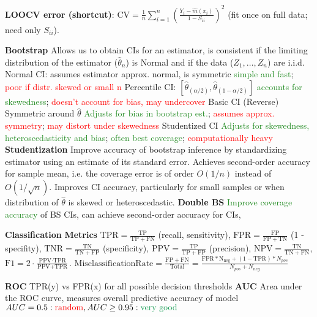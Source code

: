 \documentclass[9pt]{article}
\renewcommand\small{\footnotesize}
\newcommand{\toptopic}[1]{\textbf{{#1}}}
\newcommand{\highlight}[1]{\small{\textcolor{Sepia}{#1}}}
\newcommand{\topic}[1]{\small{\textbf{\textcolor{Sepia}{#1}}}}
\begin{document}
\begin{multicols*}{3}
\topic{LOOCV error (shortcut)}:
$\displaystyle \text{CV} = \frac{1}{n}\sum_{i=1}^n \left(\frac{Y_i - \hat m(x_i)}{1 - S_{ii}}\right)^2$
\quad (fit once on full data; need only $S_{ii}$).


\toptopic{Bootstrap}
Allows us to obtain CIs for an estimator, is consistent if the limiting distribution of the estimator ($\hat{\theta}_n$) is Normal and if the data ($Z_1, \ldots, Z_n$) are i.i.d. \highlight{Normal CI}: assumes estimator approx. normal, is symmetric \textcolor{ForestGreen}{simple and fast}; \textcolor{red}{poor if distr. skewed or small n}
\highlight{Percentile CI}: $[\hat{\theta}_{(\alpha/2)}, \hat{\theta}_{(1-\alpha/2)}]$ \textcolor{ForestGreen}{accounts for skewedness}; \textcolor{red}{doesn't account for bias, may undercover} \highlight{Basic CI (Reverse)} Symmetric around $\hat{\theta}$ \textcolor{ForestGreen}{Adjusts for bias in bootstrap est.}; \textcolor{red}{assumes approx. symmetry}; \textcolor{red}{may distort under skewedness} \highlight{Studentized CI} \textcolor{ForestGreen}{Adjusts for skewedness, heteroscedasticity and bias}; \textcolor{ForestGreen}{often best coverage}; \textcolor{red}{computationally heavy}
\topic{Studentization} Improve accuracy of bootstrap inference by standardizing estimator using an estimate of its standard error. Achieves second-order accuracy for sample mean, i.e. the coverage error is of order $O(1/n)$ instead of $O(1/\sqrt{n})$. Improves CI accuracy, particularly for small samples or when distribution of $\hat{\theta}$ is skewed or heteroscedastic.
\topic{Double BS} \textcolor{ForestGreen}{Improve coverage accuracy} of BS CIs, can achieve second-order accuracy for CIs, 

\toptopic{Classification}
\topic{Metrics}
$\text{TPR} = \frac{\mathrm{TP}}{\mathrm{TP}+\mathrm{FN}}$ (recall, sensitivity),  
$\text{FPR} = \frac{\mathrm{FP}}{\mathrm{FP}+\mathrm{TN}}$ (1 - specifity),  
$\text{TNR} = \frac{\mathrm{TN}}{\mathrm{TN}+\mathrm{FP}}$ (specificity),  
$\text{PPV} = \frac{\mathrm{TP}}{\mathrm{TP}+\mathrm{FP}}$ (precision),  
$\text{NPV} = \frac{\mathrm{TN}}{\mathrm{TN}+\mathrm{FN}}$,  
$\text{F1} = 2\cdot\frac{\text{PPV}\cdot\text{TPR}}{\text{PPV}+\text{TPR}}$.
$\text{MisclassificationRate} = \frac{\mathrm{FP +FN}}{\text{Total}} =\frac{\mathrm{FPR*N_{neg}+(1-TPR)}*N_{pos}}{N_{pos} + N_{neg}}$

\topic{ROC} TPR(y) vs FPR(x) for all possible decision thresholds
\topic{AUC} Area under the ROC curve, measures overall predictive accuracy of model $AUC=0.5: \textcolor{red}{\text{random}}, AUC \geq 0.95: \textcolor{ForestGreen}{\text{very good}}$


\end{multicols*}
\end{document}
